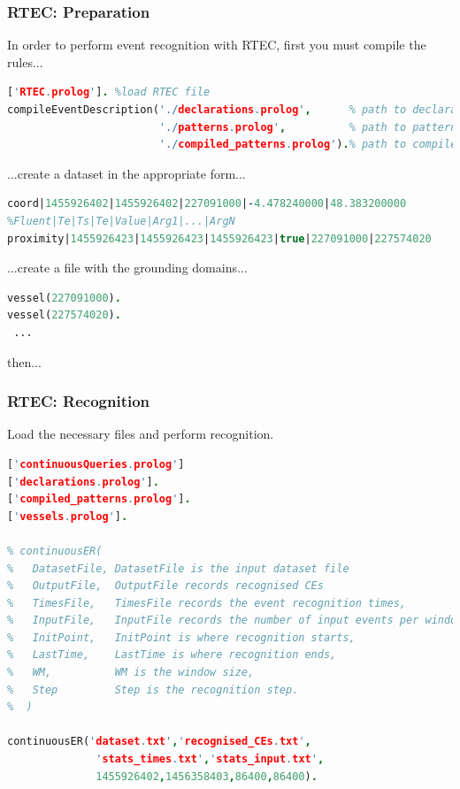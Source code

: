 \documentclass{beamer}
\begin{document}

\begin{frame}[fragile]
\frametitle{RTEC: Preparation}
\footnotesize
In order to perform event recognition with RTEC, first you must compile the rules...
\begin{lstlisting}[language=Prolog, basicstyle=\tiny,]
% open yap prolog
['RTEC.prolog']. %load RTEC file
compileEventDescription('./declarations.prolog',      % path to declarations file
                        './patterns.prolog',          % path to patterns file
                        './compiled_patterns.prolog').% path to compiled patterns
\end{lstlisting}
\pause
...create a dataset in the appropriate form...
\begin{lstlisting}[language=Prolog, basicstyle=\tiny,]
%Event|T|T|Arg1|...|ArgN
coord|1455926402|1455926402|227091000|-4.478240000|48.383200000
%Fluent|Te|Ts|Te|Value|Arg1|...|ArgN
proximity|1455926423|1455926423|1455926423|true|227091000|227574020
\end{lstlisting}
\pause
...create a file with the grounding domains...
\begin{lstlisting}[language=Prolog, basicstyle=\tiny,]
vessel(227091000).
vessel(227574020).
 ...
\end{lstlisting}
then...
\end{frame}


\begin{frame}[fragile]
\frametitle{RTEC: Recognition}
\footnotesize
Load the necessary files and perform recognition.
\begin{lstlisting}[language=Prolog, basicstyle=\tiny,]
['continuousQueries.prolog']
['declarations.prolog'].
['compiled_patterns.prolog'].
['vessels.prolog'].

% continuousER(
%   DatasetFile, DatasetFile is the input dataset file
%   OutputFile,  OutputFile records recognised CEs
%   TimesFile,   TimesFile records the event recognition times,
%   InputFile,   InputFile records the number of input events per window,
%   InitPoint,   InitPoint is where recognition starts,
%   LastTime,    LastTime is where recognition ends,
%   WM,          WM is the window size,
%   Step         Step is the recognition step.
%  )

continuousER('dataset.txt','recognised_CEs.txt',
              'stats_times.txt','stats_input.txt',
              1455926402,1456358403,86400,86400).
\end{lstlisting}

\end{frame}
\end{document}
